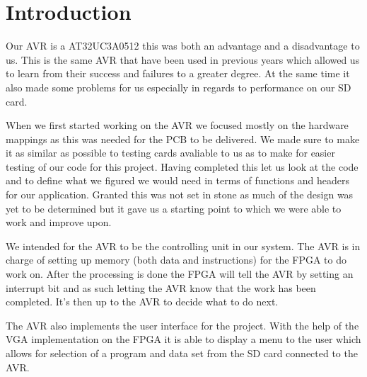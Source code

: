\section{Introduction}

Our AVR is a AT32UC3A0512 this was both an advantage and a disadvantage to us. This is the same AVR that have been used in previous years which allowed us to learn from their success and failures to a greater degree. At the same time it also made some problems for us especially in regards to performance on our SD card. 

When we first started working on the AVR we focused mostly on the hardware mappings as this was needed for the PCB to be delivered. We made sure to make it as similar as possible to testing cards avaliable to us as to make for easier testing of our code for this project. Having completed this let us look at the code and to define what we figured we would need in terms of functions and headers for our application. Granted this was not set in stone as much of the design was yet to be determined but it gave us a starting point to which we were able to work and improve upon.

We intended for the AVR to be the controlling unit in our system. The AVR is in charge of setting up memory (both data and instructions) for the FPGA to do work on. After the processing is done the FPGA will tell the AVR by setting an interrupt bit and as such letting the AVR know that the work has been completed. It's then up to the AVR to decide what to do next. 

The AVR also implements the user interface for the project. With the help of the VGA implementation on the FPGA it is able to display a menu to the user which allows for selection of a program and data set from the SD card connected to the AVR.
